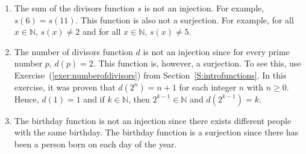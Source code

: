 \begin{enumerate}
%
%
%
%


\item The sum of the divisors function $s$ is not an injection.  For example, 
$s ( 6 ) = s ( 11 )$.  This function is also not a surjection.  For example, for all 
$x \in \mathbb{N}$, $s ( x ) \ne 2$ and for all  
$x \in \mathbb{N}$, $s ( x ) \ne 5$.



\item The number of divisors function $d$ is not an injection since for every prime number $p$, $d ( p ) = 2$.  This function is, however, a surjection.  To see this, use 
Exercise~(\ref{exer:numberofdivisors}) from Section~\ref{S:introfunctions}.  In this exercise, it was proven that $d ( 2^n ) = n + 1$ for each integer $n$ with $n \geq 0$.  Hence, $d ( 1 ) = 1$ and if $k \in \mathbb{N}$, then $2^{k-1} \in \mathbb{N}$ and 
$d ( 2^{k-1} ) = k$.



\item The birthday function is not an injection since there exists different people with the same birthday.  The birthday function is a surjection since there has been a person born on each day of the year.


\end{enumerate}
